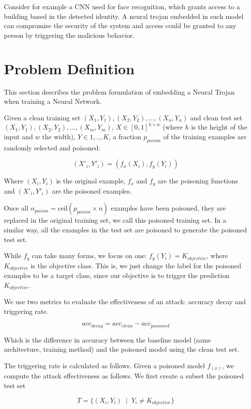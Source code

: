 \documentclass[letterpaper, 10 pt, conference]{ieeeconf}  %
\begin{document}
Consider for example a CNN used for face recognition, which grants access to a building based in the detected identity. A neural trojan embedded in such model can compromise the security of the system and access could be granted to any person by triggering the malicious behavior.


\section{Problem Definition}

This section describes the problem formulation of embedding a Neural Trojan
when training a Neural Network.

Given a clean training set $(X_1, Y_1), (X_2, Y_2),..., (X_n, Y_n)$ and clean test set $(X_1, Y_1), (X_2, Y_2),..., (X_m, Y_m)$, $X \in [0, 1]^{h \times w}$ (where $h$ is the height of the input and $w$ the width), $Y \in 1,..,K$, a fraction $p_{poison}$ of the training examples are randomly selected and poisoned:

$$(X'_i, Y'_i) = (f_x(X_i), f_y(Y_i))$$

Where $(X_i, Y_i)$ is the original example, $f_x$ and $f_y$ are the poisoning functions and $(X'_i, Y'_i)$ are the poisoned examples.

Once all $n_{poison} = \text{ceil}(p_{poison} \times n)$ examples have been poisoned, they are replaced in the original training set, we call this poisoned training set. In a similar way, all the examples in the test set are poisoned to generate the poisoned test set.

While $f_y$ can take many forms, we focus on one: $f_y(Y_i) = K_{objective}$, where $K_{objective}$ is the objective class. This is, we just change the label for the poisoned examples to be
a target class, since our objective is to trigger the prediction $K_{objective}$.

We use two metrics to evaluate the effectiveness of an attack: accuracy decay
and triggering rate.

$$acc_{decay} = acc_{clean} - acc_{posioned}$$

Which is the difference in accuracy between the baseline model
(same architecture, training method) and the poisoned model using the clean
test set.

The triggering rate is calculated as follows. Given a poisoned model $f_(x)$,
we compute the attack effectiveness as follows. We first create a subset the
poisoned test set 

$$T = \{(X_i, Y_i) \;\;|\;\;Y_i  \neq K_{objective}\}$$
\end{document}
